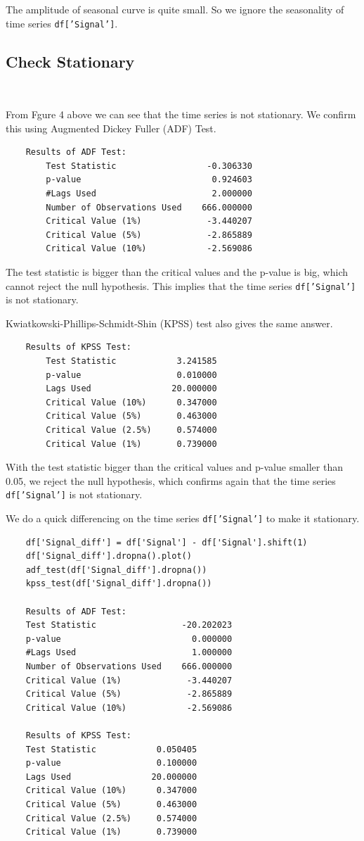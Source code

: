 \documentclass[11pt, oneside]{article}   	%
\begin{document}
The amplitude of seasonal curve is quite small. So we ignore the seasonality of time series \texttt{df['Signal']}.

\subsection{Check Stationary}

\

From  Fgure 4 above we can see that the time series is not stationary. We confirm this using Augmented Dickey Fuller (ADF) Test.
\begin{lstlisting}
	Results of ADF Test:
		Test Statistic                  -0.306330
		p-value                          0.924603
		#Lags Used                       2.000000
		Number of Observations Used    666.000000
		Critical Value (1%)             -3.440207
		Critical Value (5%)             -2.865889
		Critical Value (10%)            -2.569086
\end{lstlisting}
The test statistic is bigger than the critical values and the p-value is big, which cannot reject the null hypothesis.   This implies that the time series \texttt{df['Signal']} is not stationary.

Kwiatkowski-Phillips-Schmidt-Shin (KPSS) test also gives the same answer.
\begin{lstlisting}
	Results of KPSS Test:
		Test Statistic            3.241585
		p-value                   0.010000
		Lags Used                20.000000
		Critical Value (10%)      0.347000
		Critical Value (5%)       0.463000
		Critical Value (2.5%)     0.574000
		Critical Value (1%)       0.739000
\end{lstlisting}
With the test statistic bigger than the critical values and p-value smaller than 0.05, we reject the null hypothesis, which confirms again that the time series \texttt{df['Signal']} is not stationary. 

We do a quick differencing on the time series \texttt{df['Signal']}  to make it stationary.
\begin{lstlisting}
	df['Signal_diff'] = df['Signal'] - df['Signal'].shift(1)
	df['Signal_diff'].dropna().plot()
	adf_test(df['Signal_diff'].dropna())
	kpss_test(df['Signal_diff'].dropna())
	
	Results of ADF Test:
	Test Statistic                 -20.202023
	p-value                          0.000000
	#Lags Used                       1.000000
	Number of Observations Used    666.000000
	Critical Value (1%)             -3.440207
	Critical Value (5%)             -2.865889
	Critical Value (10%)            -2.569086
	
	Results of KPSS Test:
	Test Statistic            0.050405
	p-value                   0.100000
	Lags Used                20.000000
	Critical Value (10%)      0.347000
	Critical Value (5%)       0.463000
	Critical Value (2.5%)     0.574000
	Critical Value (1%)       0.739000
\end{lstlisting}
\end{document}
